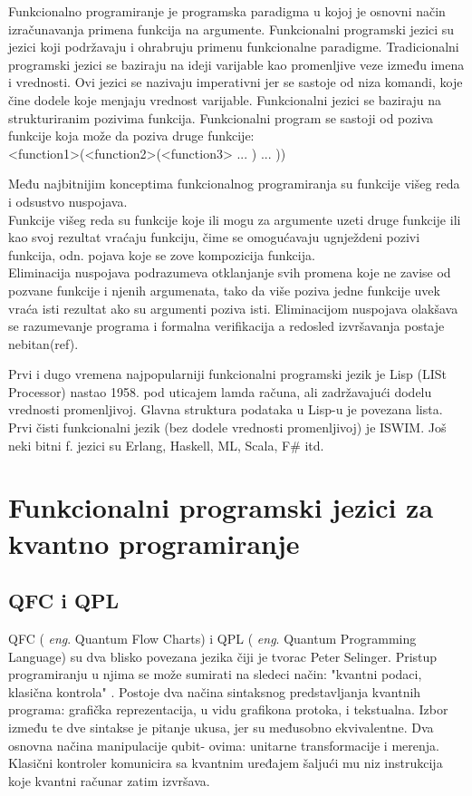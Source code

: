 \documentclass[a4paper]{article}
\begin{document}
{Funkcionalno programiranje je programska paradigma u kojoj je osnovni način izračunavanja primena funkcija na argumente.\cite{funcPro}
Funkcionalni programski jezici su jezici koji podržavaju i ohrabruju primenu funkcionalne paradigme.
Tradicionalni programski jezici se baziraju na ideji varijable kao promenljive veze između imena i vrednosti. Ovi jezici se nazivaju 
imperativni jer se sastoje od niza komandi, koje čine dodele koje menjaju vrednost varijable.
Funkcionalni jezici se baziraju na strukturiranim pozivima funkcija. Funkcionalni program se sastoji od poziva funkcije koja može da
poziva druge funkcije:\\
<function1>(<function2>(<function3> ... ) ... ))\cite{funcPro}

Među najbitnijim konceptima funkcionalnog programiranja su funkcije višeg reda i odsustvo nuspojava. \\
Funkcije višeg reda su funkcije koje ili mogu za argumente uzeti druge funkcije ili kao svoj rezultat vraćaju funkciju, čime se omogućavaju ugnježdeni pozivi funkcija, odn. pojava koje se zove kompozicija funkcija.\\
Eliminacija nuspojava podrazumeva otklanjanje svih promena koje ne zavise od pozvane funkcije i njenih argumenata, tako da više poziva jedne funkcije uvek vraća isti rezultat ako su argumenti poziva isti. Eliminacijom nuspojava olakšava se razumevanje programa i formalna 
verifikacija a redosled izvršavanja postaje nebitan(ref).\par
Prvi i dugo vremena najpopularniji funkcionalni programski jezik je Lisp (LISt Processor) nastao 1958. pod uticajem lamda računa, ali 
zadržavajući dodelu vrednosti promenljivoj. Glavna struktura podataka u Lisp-u je povezana lista. Prvi čisti funkcionalni jezik 
(bez dodele vrednosti promenljivoj) je ISWIM. Još neki bitni f. jezici su Erlang, Haskell, ML, Scala, F\# itd.

\section{Funkcionalni programski jezici za kvantno programiranje}
\label{sec:funcprl_qp}

\subsection{QFC i QPL}\cite{qfc}
\label{sec:qfc_qml}

QFC ( \emph{eng}. Quantum Flow Charts) i QPL ( \emph{eng}. Quantum Programming Language) su dva blisko povezana jezika čiji je tvorac Peter Selinger.  Pristup programiranju u njima se može sumirati na sledeci način: "kvantni podaci, klasična kontrola" \cite[p. 1]{qfc}. Postoje dva načina sintaksnog predstavljanja kvantnih programa: grafička reprezentacija, u vidu grafikona protoka, i tekstualna. Izbor između te dve sintakse je pitanje ukusa, jer su međusobno ekvivalentne. \cite[p. 2]{qfc} Dva osnovna načina manipulacije qubit- ovima: unitarne transformacije i merenja. Klasični kontroler komunicira sa kvantnim uređajem šaljući mu niz instrukcija koje kvantni računar zatim izvršava. 

}
\end{document}

